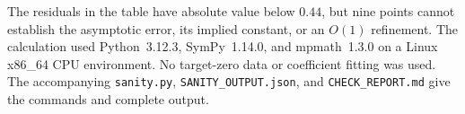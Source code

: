 The residuals in the table have absolute value below
$0.44$, but nine points cannot establish the asymptotic
error, its implied constant, or an $O(1)$ refinement.
The calculation used Python~3.12.3, SymPy~1.14.0,
and mpmath~1.3.0 on a Linux x86\_64 CPU environment.
No target-zero data or coefficient fitting was used.
The accompanying \texttt{sanity.py},
\texttt{SANITY\_OUTPUT.json}, and
\texttt{CHECK\_REPORT.md} give the commands and
complete output.
